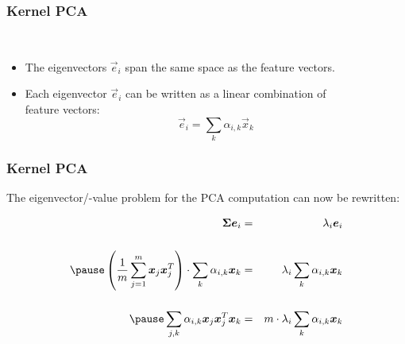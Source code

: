\begin{frame}
	\frametitle{Kernel PCA \cont}

	 \\[.5cm] \pause

	\begin{itemize}
		\item The eigenvectors $\vec e_i$ span the same space as the feature vectors. \\[.5cm] \pause
		\item Each eigenvector $\vec e_i$ can be written as a linear combination of \\
		      feature vectors:
		      \begin{displaymath}
			      \vec e_i = \sum_{k} \alpha_{i,k} \vec x_k
		      \end{displaymath}
	\end{itemize}
\end{frame}


\begin{frame}
	\frametitle{Kernel PCA \cont}

	The eigenvector/-value problem for the PCA computation can now be rewritten:

	\begin{eqnarray*}
		\mat \Sigma \vec e_i
		&=& \lambda_i \vec e _i \\[.5cm] \pause
		\left( \frac{1}{m}\sum_{j=1}^m \vec x_j \vec x_j^T\right) \cdot \sum_k \alpha_{i,k} \vec x_k
		&=& \lambda_i \sum_{k} \alpha_{i,k} \vec x_k \\[.5cm] \pause
		\sum_{j,k} \alpha_{i,k} \vec x_j \vec x_j^T\vec x_k
		&=& m \cdot \lambda_i \sum_{k} \alpha_{i,k} \vec x_k
	\end{eqnarray*}
\end{frame}


